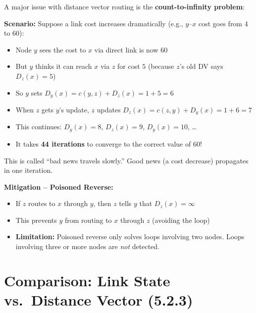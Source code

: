 \begin{exambox}
A major issue with distance vector routing is the \textbf{count-to-infinity problem}:

\textbf{Scenario:} Suppose a link cost increases dramatically (e.g., $y$--$x$ cost goes from 4 to 60):
\begin{itemize}[noitemsep]
    \item Node $y$ sees the cost to $x$ via direct link is now 60
    \item But $y$ thinks it can reach $x$ via $z$ for cost $5$ (because $z$'s old DV says $D_z(x) = 5$)
    \item So $y$ sets $D_y(x) = c(y,z) + D_z(x) = 1 + 5 = 6$
    \item When $z$ gets $y$'s update, $z$ updates $D_z(x) = c(z,y) + D_y(x) = 1 + 6 = 7$
    \item This continues: $D_y(x) = 8$, $D_z(x) = 9$, $D_y(x) = 10$, \ldots
    \item It takes \textbf{44 iterations} to converge to the correct value of 60!
\end{itemize}

This is called ``bad news travels slowly.'' Good news (a cost decrease) propagates in one iteration.

\medskip
\textbf{Mitigation -- Poisoned Reverse:}
\begin{itemize}[noitemsep]
    \item If $z$ routes to $x$ through $y$, then $z$ tells $y$ that $D_z(x) = \infty$
    \item This prevents $y$ from routing to $x$ through $z$ (avoiding the loop)
    \item \textbf{Limitation:} Poisoned reverse only solves loops involving two nodes. Loops involving three or more nodes are \emph{not} detected.
\end{itemize}
\end{exambox}

\section{Comparison: Link State vs.\ Distance Vector (5.2.3)}

